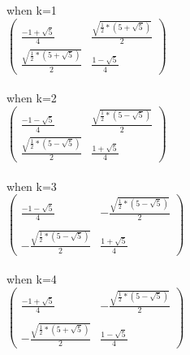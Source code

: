 \documentclass{article}
\begin{document}
when k=1\\

$\begin{pmatrix}
\frac{-1+\sqrt{5}}{4} & \frac{\sqrt{\frac{1}{2}*(5+\sqrt{5})}}{2}\\
\frac{\sqrt{\frac{1}{2}*(5+\sqrt{5})}}{2}& \frac{1-\sqrt{5}}{4}
\end{pmatrix}$ \\\\

when k=2\\

$\begin{pmatrix}
\frac{-1-\sqrt{5}}{4} & \frac{\sqrt{\frac{1}{2}*(5-\sqrt{5})}}{2}\\
\frac{\sqrt{\frac{1}{2}*(5-\sqrt{5})}}{2}& \frac{1+\sqrt{5}}{4}
\end{pmatrix}$\\\\

when k=3\\

$\begin{pmatrix}
\frac{-1-\sqrt{5}}{4} & -\frac{\sqrt{\frac{1}{2}*(5-\sqrt{5})}}{2}\\\\
-\frac{\sqrt{\frac{1}{2}*(5-\sqrt{5})}}{2}& \frac{1+\sqrt{5}}{4}
\end{pmatrix}$ \\\\

when k=4\\

$\begin{pmatrix}
\frac{-1+\sqrt{5}}{4} & -\frac{\sqrt{\frac{1}{2}*(5-\sqrt{5})}}{2}\\\\
-\frac{\sqrt{\frac{1}{2}*(5+\sqrt{5})}}{2}& \frac{1-\sqrt{5}}{4}
\end{pmatrix}$ 
\vspace{11cm}
\graphicspath{{pictures/}}
\end{document}
